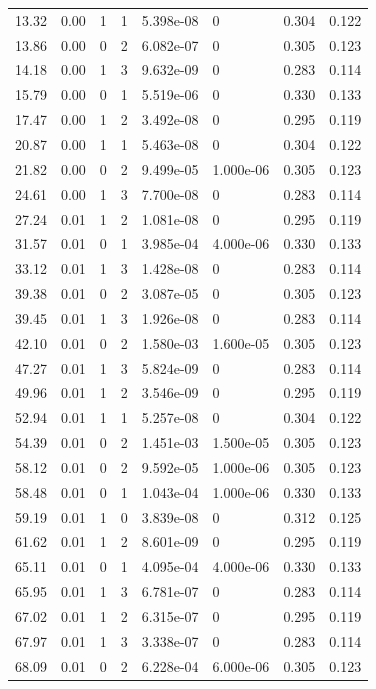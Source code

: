 \documentclass[preview]{standalone}
\begin{document}
{{\begin{tabular}{L{1.2cm}C{1.2cm} C{0.3cm}C{0.5cm} C{1.4cm}C{1.4cm} C{1.4cm}C{1.4cm}}
  13.32  &  0.00  & 1     &  1 &  5.398e-08  & 0  & 0.304 &  0.122   \\ 
  13.86  &  0.00  & 0     &  2 &  6.082e-07  & 0  & 0.305 &  0.123   \\ 
  14.18  &  0.00  & 1     &  3 &  9.632e-09  & 0  & 0.283 &  0.114   \\ 
  15.79  &  0.00  & 0     &  1 &  5.519e-06  & 0  & 0.330 &  0.133   \\ 
  17.47  &  0.00  & 1     &  2 &  3.492e-08  & 0  & 0.295 &  0.119   \\ 
  20.87  &  0.00  & 1     &  1 &  5.463e-08  & 0  & 0.304 &  0.122   \\ 
  21.82  &  0.00  & 0     &  2 &  9.499e-05  & 1.000e-06  & 0.305 &  0.123   \\ 
  24.61  &  0.00  & 1     &  3 &  7.700e-08  & 0  & 0.283 &  0.114   \\ 
  27.24  &  0.01  & 1     &  2 &  1.081e-08  & 0  & 0.295 &  0.119   \\ 
  31.57  &  0.01  & 0     &  1 &  3.985e-04  & 4.000e-06  & 0.330 &  0.133   \\ 
  33.12  &  0.01  & 1     &  3 &  1.428e-08  & 0  & 0.283 &  0.114   \\ 
  39.38  &  0.01  & 0     &  2 &  3.087e-05  & 0  & 0.305 &  0.123   \\ 
  39.45  &  0.01  & 1     &  3 &  1.926e-08  & 0  & 0.283 &  0.114   \\ 
  42.10  &  0.01  & 0     &  2 &  1.580e-03  & 1.600e-05  & 0.305 &  0.123   \\ 
  47.27  &  0.01  & 1     &  3 &  5.824e-09  & 0  & 0.283 &  0.114   \\ 
  49.96  &  0.01  & 1     &  2 &  3.546e-09  & 0  & 0.295 &  0.119   \\ 
  52.94  &  0.01  & 1     &  1 &  5.257e-08  & 0  & 0.304 &  0.122   \\ 
  54.39  &  0.01  & 0     &  2 &  1.451e-03  & 1.500e-05  & 0.305 &  0.123   \\ 
  58.12  &  0.01  & 0     &  2 &  9.592e-05  & 1.000e-06  & 0.305 &  0.123   \\ 
  58.48  &  0.01  & 0     &  1 &  1.043e-04  & 1.000e-06  & 0.330 &  0.133   \\ 
  59.19  &  0.01  & 1     &  0 &  3.839e-08  & 0  & 0.312 &  0.125   \\ 
  61.62  &  0.01  & 1     &  2 &  8.601e-09  & 0  & 0.295 &  0.119   \\ 
  65.11  &  0.01  & 0     &  1 &  4.095e-04  & 4.000e-06  & 0.330 &  0.133   \\ 
  65.95  &  0.01  & 1     &  3 &  6.781e-07  & 0  & 0.283 &  0.114   \\ 
  67.02  &  0.01  & 1     &  2 &  6.315e-07  & 0  & 0.295 &  0.119   \\ 
  67.97  &  0.01  & 1     &  3 &  3.338e-07  & 0  & 0.283 &  0.114   \\ 
  68.09  &  0.01  & 0     &  2 &  6.228e-04  & 6.000e-06  & 0.305 &  0.123   \\ 
\hline 
\end{tabular} 

}}
\end{document}
